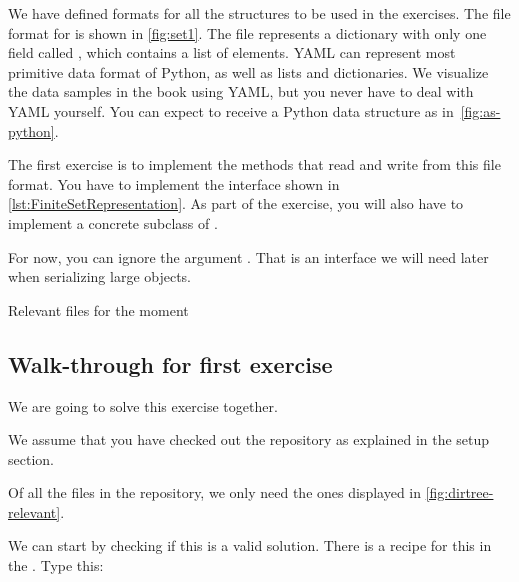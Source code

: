 We have defined formats for all the structures to be used in the exercises.
The file format for \FiniteSet is shown in \cref{fig:set1}.
The file represents a dictionary with only one field called , which contains a list of elements.
YAML can represent most primitive data format of Python, as well as lists and dictionaries.
We visualize the data samples in the book using YAML, but you never have to deal with YAML yourself.
You can expect to receive a Python data structure as in~\cref{fig:as-python}.

\begin{gradedexercise}
  \label{ex:setrepr}
  The first exercise is to implement the methods that read and write from this file format.
  You have to implement the interface \FiniteSetRepresentation
  shown in \cref{lst:FiniteSetRepresentation}.
  As part of the exercise, you will also have to implement a concrete subclass of \FiniteSet.
\end{gradedexercise}

\begin{longcode}
  \centering
  \caption{}\label{lst:FiniteSetRepresentation}
\end{longcode}

For now, you can ignore the argument . That is an interface we will need
later when serializing large objects.

%
\begin{marginfigure}
  \caption{Relevant files for the moment}
  \label{fig:dirtree-relevant}
\end{marginfigure}

\subsection{Walk-through for first exercise}

We are going to solve this exercise together.

We assume that you have checked out the repository as explained in the setup section.

Of all the files in the repository, we only need the ones displayed in \cref{fig:dirtree-relevant}.
%
%


We can start by checking if this is a valid solution.
There is a recipe for this in the .
Type this:

